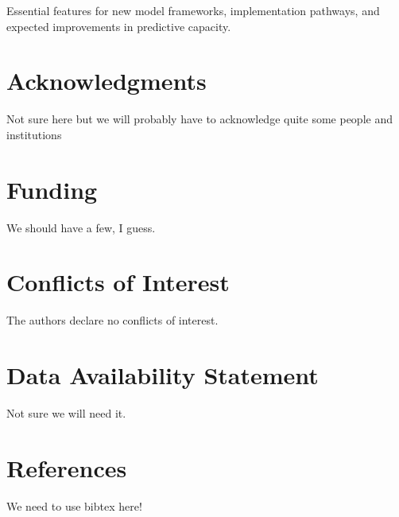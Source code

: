 \documentclass[12pt,a4paper]{article}
\begin{document}
Essential features for new model frameworks, implementation pathways, and expected improvements in predictive capacity.




\section*{Acknowledgments}

Not sure here but we will probably have to acknowledge quite some people and institutions

\section*{Funding}

We should have a few, I guess.

\section*{Conflicts of Interest}

The authors declare no conflicts of interest.


\section*{Data Availability Statement}

Not sure we will need it.



\section{References}
We need to use bibtex here!
\end{document}
